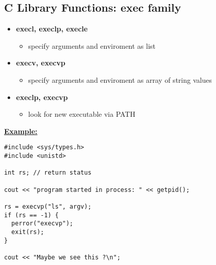 \documentclass{report}
\begin{document}
\subsection{C Library Functions: exec family}
\begin{itemize}
  \item \textbf{execl, execlp, execle}
    \begin{itemize}[label=$\circ$]
      \item specify arguments and enviroment as list
    \end{itemize}
  \item \textbf{execv, execvp}
    \begin{itemize}[label=$\circ$]
      \item specify arguments and enviroment as array of string values
    \end{itemize}
  \item \textbf{execlp, execvp}
    \begin{itemize}[label=$\circ$]
      \item look for new executable via PATH
    \end{itemize}
\end{itemize}
\bigbreak \noindent
\textbf{\underline{Example:}}
\begin{verbatim}
#include <sys/types.h>
#include <unistd>

int rs; // return status

cout << "program started in process: " << getpid();

rs = execvp("ls", argv);
if (rs == -1) {
  perror("execvp");
  exit(rs);
}

cout << "Maybe we see this ?\n";
\end{verbatim}
\end{document}
